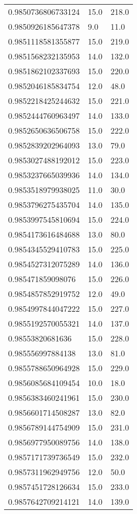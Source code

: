 \begin{center}
\begin{supertabular}[H]{p{0.30\textwidth}p{0.05\textwidth}p{0.05\textwidth}}
0.9850736806733124 & 15.0 & 218.0 \\ 
0.9850926185647378 & 9.0 & 11.0 \\ 
0.9851118581355877 & 15.0 & 219.0 \\ 
0.9851568232135953 & 14.0 & 132.0 \\ 
0.9851862102337693 & 15.0 & 220.0 \\ 
0.9852046185834754 & 12.0 & 48.0 \\ 
0.9852218425244632 & 15.0 & 221.0 \\ 
0.9852444760963497 & 14.0 & 133.0 \\ 
0.9852650636506758 & 15.0 & 222.0 \\ 
0.9852839202964093 & 13.0 & 79.0 \\ 
0.9853027488192012 & 15.0 & 223.0 \\ 
0.9853237665039936 & 14.0 & 134.0 \\ 
0.9853518979938025 & 11.0 & 30.0 \\ 
0.9853796275435704 & 14.0 & 135.0 \\ 
0.9853997545810694 & 15.0 & 224.0 \\ 
0.9854173616484688 & 13.0 & 80.0 \\ 
0.9854345529410783 & 15.0 & 225.0 \\ 
0.9854527312075289 & 14.0 & 136.0 \\ 
0.985471859098076 & 15.0 & 226.0 \\ 
0.9854857852919752 & 12.0 & 49.0 \\ 
0.9854997844047222 & 15.0 & 227.0 \\ 
0.9855192570055321 & 14.0 & 137.0 \\ 
0.98553820681636 & 15.0 & 228.0 \\ 
0.985556997884138 & 13.0 & 81.0 \\ 
0.9855788650964928 & 15.0 & 229.0 \\ 
0.9856085684109454 & 10.0 & 18.0 \\ 
0.9856383460241961 & 15.0 & 230.0 \\ 
0.9856601714508287 & 13.0 & 82.0 \\ 
0.9856789144754909 & 15.0 & 231.0 \\ 
0.9856977950089756 & 14.0 & 138.0 \\ 
0.9857171739736549 & 15.0 & 232.0 \\ 
0.9857311962949756 & 12.0 & 50.0 \\ 
0.9857451728126634 & 15.0 & 233.0 \\ 
0.9857642709214121 & 14.0 & 139.0 \\ 

\end{supertabular}
\end{center}
